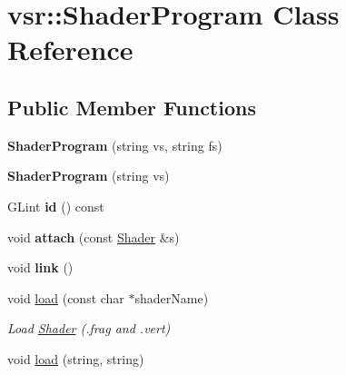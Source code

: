 \hypertarget{classvsr_1_1_shader_program}{\section{vsr\-:\-:Shader\-Program Class Reference}
\label{classvsr_1_1_shader_program}
}
\subsection*{Public Member Functions}
\begin{DoxyCompactItemize}
\item 
\hypertarget{classvsr_1_1_shader_program_a84a64c3345109c1e90f54163783c32ff}{{\bfseries Shader\-Program} (string vs, string fs)}\label{classvsr_1_1_shader_program_a84a64c3345109c1e90f54163783c32ff}

\item 
\hypertarget{classvsr_1_1_shader_program_a74a1adb8768dfadf7663007882eaf144}{{\bfseries Shader\-Program} (string vs)}\label{classvsr_1_1_shader_program_a74a1adb8768dfadf7663007882eaf144}

\item 
\hypertarget{classvsr_1_1_shader_program_aba6385817be2c1b4b3f8785f686e28fe}{G\-Lint {\bfseries id} () const }\label{classvsr_1_1_shader_program_aba6385817be2c1b4b3f8785f686e28fe}

\item 
\hypertarget{classvsr_1_1_shader_program_a28e800116bb4755be12821ee52686686}{void {\bfseries attach} (const \hyperlink{classvsr_1_1_shader}{Shader} \&s)}\label{classvsr_1_1_shader_program_a28e800116bb4755be12821ee52686686}

\item 
\hypertarget{classvsr_1_1_shader_program_a1bdf1371c7253b2f1be67611a12041c7}{void {\bfseries link} ()}\label{classvsr_1_1_shader_program_a1bdf1371c7253b2f1be67611a12041c7}

\item 
\hypertarget{classvsr_1_1_shader_program_aa0b51156d73858125a0ef5342002df83}{void \hyperlink{classvsr_1_1_shader_program_aa0b51156d73858125a0ef5342002df83}{load} (const char $\ast$shader\-Name)}\label{classvsr_1_1_shader_program_aa0b51156d73858125a0ef5342002df83}

\begin{DoxyCompactList}\small\item\em Load \hyperlink{classvsr_1_1_shader}{Shader} (.frag and .vert) \end{DoxyCompactList}\item 
\hypertarget{classvsr_1_1_shader_program_acb9fa285021c4a342ed48801f5260b76}{void \hyperlink{classvsr_1_1_shader_program_acb9fa285021c4a342ed48801f5260b76}{load} (string, string)}\label{classvsr_1_1_shader_program_acb9fa285021c4a342ed48801f5260b76}


\end{DoxyCompactItemize}
